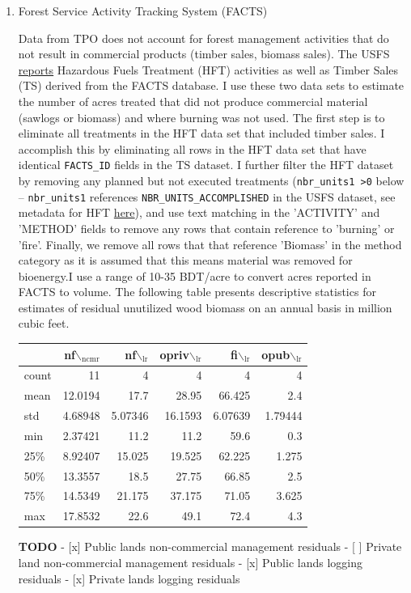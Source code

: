 \documentclass[a4paper]{article}
\begin{document}
\begin{enumerate}
\item Forest Service Activity Tracking System (FACTS)
\label{sec:orgheadline9}

Data from TPO does not account for forest management activities that do
not result in commercial products (timber sales, biomass sales). The
USFS
\href{http://data.fs.usda.gov/geodata/edw/datasets.php?dsetParent=Activities}{reports}
Hazardous Fuels Treatment (HFT) activities as well as Timber Sales (TS)
derived from the FACTS database. I use these two data sets to estimate
the number of acres treated that did not produce commercial material
(sawlogs or biomass) and where burning was not used. The first step is
to eliminate all treatments in the HFT data set that included timber
sales. I accomplish this by eliminating all rows in the HFT data set
that have identical \texttt{FACTS\_ID} fields in the TS dataset. I further
filter the HFT dataset by removing any planned but not executed
treatments (\texttt{nbr\_units1 >0} below -- \texttt{nbr\_units1} references
\texttt{NBR\_UNITS\_ACCOMPLISHED} in the USFS dataset, see metadata for HFT
\href{http://data.fs.usda.gov/geodata/edw/edw_resources/meta/S_USA.Activity_HazFuelTrt_PL.xml}{here}),
and use text matching in the 'ACTIVITY' and 'METHOD' fields to remove
any rows that contain reference to 'burning' or 'fire'. Finally, we
remove all rows that that reference 'Biomass' in the method category as
it is assumed that this means material was removed for bioenergy.I use a
range of 10-35 BDT/acre to convert acres reported in FACTS to volume.
The following table presents descriptive statistics for estimates of
residual unutilized wood biomass on an annual basis in million cubic
feet.

\begin{center}
\begin{tabular}{lrrrrr}
 & nf$\backslash$\(_{\text{ncmr}}\) & nf$\backslash$\(_{\text{lr}}\) & opriv$\backslash$\(_{\text{lr}}\) & fi$\backslash$\(_{\text{lr}}\) & opub$\backslash$\(_{\text{lr}}\)\\
\hline
count & 11 & 4 & 4 & 4 & 4\\
mean & 12.0194 & 17.7 & 28.95 & 66.425 & 2.4\\
std & 4.68948 & 5.07346 & 16.1593 & 6.07639 & 1.79444\\
min & 2.37421 & 11.2 & 11.2 & 59.6 & 0.3\\
25\% & 8.92407 & 15.025 & 19.525 & 62.225 & 1.275\\
50\% & 13.3557 & 18.5 & 27.75 & 66.85 & 2.5\\
75\% & 14.5349 & 21.175 & 37.175 & 71.05 & 3.625\\
max & 17.8532 & 22.6 & 49.1 & 72.4 & 4.3\\
\end{tabular}

\end{center}

\textbf{TODO} - [x] Public lands non-commercial management residuals - [ ]
Private land non-commercial management residuals - [x] Public lands
logging residuals - [x] Private lands logging residuals
\end{enumerate}
\end{document}
